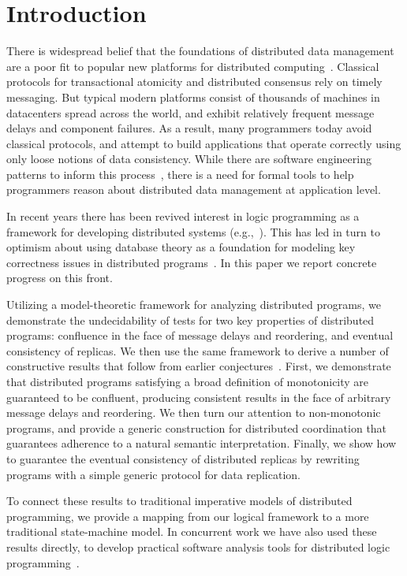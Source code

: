 \section{Introduction}
There is widespread belief that the foundations of distributed data management are a poor fit to popular new platforms for distributed computing~\cite{ladis}. Classical protocols for transactional atomicity and distributed consensus rely on timely messaging. But typical modern platforms consist of thousands of machines in datacenters spread across the world, and exhibit relatively frequent message delays and component failures.  As a result, many programmers today avoid classical protocols, and attempt to build applications that operate correctly using only loose notions of data consistency.  While there are software engineering patterns to inform this process~\cite{quicksand}, there is a need for formal tools to help programmers reason about distributed data management at application level.

In recent years there has been revived interest in logic programming as a framework for developing distributed systems (e.g.,~\cite{reactors,boom}).  This has led in turn to optimism about using database theory as a foundation for modeling key correctness issues in distributed programs~\cite{declarative-imperative}.
In this paper we report concrete progress on this front.  

Utilizing a model-theoretic framework for analyzing distributed programs, we demonstrate the undecidability of tests for two key properties of distributed programs: confluence in the face of message delays and reordering, and eventual consistency of replicas.  We then use the same framework to derive a number of constructive results that follow from earlier conjectures~\cite{declarative-imperative}.
First, we demonstrate that distributed programs satisfying a broad definition of  monotonicity are guaranteed to be confluent, producing consistent results in the face of arbitrary message delays and reordering.  We then turn our attention to non-monotonic programs, and provide a generic construction for distributed coordination that guarantees adherence to a natural semantic interpretation.  Finally, we show how to guarantee the eventual consistency of distributed replicas by rewriting programs with a simple generic protocol for data replication.

To connect these results to traditional imperative models of distributed programming, we provide a mapping from our logical framework to a more traditional state-machine model.  In concurrent work we have also used these results directly, to develop practical software analysis tools for distributed logic programming~\cite{cidr11}.  

